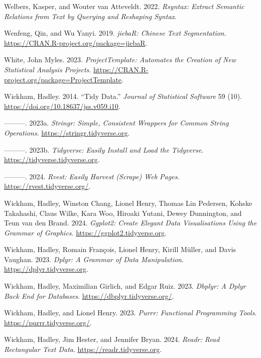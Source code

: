 \documentclass[
  letterpaper,
]{latex/krantz}
\newlength{\cslhangindent}
\newenvironment{CSLReferences}[2] %
 {\begin{list}{}{%
  \setlength{\itemindent}{0pt}
  \setlength{\leftmargin}{0pt}
  \setlength{\parsep}{0pt}
  \ifodd #1
   \setlength{\leftmargin}{\cslhangindent}
   \setlength{\itemindent}{-1\cslhangindent}
  \fi
  \setlength{\itemsep}{#2\baselineskip}}}
 {\end{list}}
\theoremstyle{definition}
\theoremstyle{remark}
\begin{document}
\begin{CSLReferences}{1}{0}
Welbers, Kasper, and Wouter van Atteveldt. 2022. \emph{Rsyntax: Extract
Semantic Relations from Text by Querying and Reshaping Syntax}.

Wenfeng, Qin, and Wu Yanyi. 2019. \emph{jiebaR: Chinese Text
Segmentation}. \url{https://CRAN.R-project.org/package=jiebaR}.

White, John Myles. 2023. \emph{ProjectTemplate: Automates the Creation
of New Statistical Analysis Projects}.
\url{https://CRAN.R-project.org/package=ProjectTemplate}.

Wickham, Hadley. 2014. {``Tidy Data.''} \emph{Journal of Statistical
Software} 59 (10). \url{https://doi.org/10.18637/jss.v059.i10}.

---------. 2023a. \emph{Stringr: Simple, Consistent Wrappers for Common
String Operations}. \url{https://stringr.tidyverse.org}.

---------. 2023b. \emph{Tidyverse: Easily Install and Load the
Tidyverse}. \url{https://tidyverse.tidyverse.org}.

---------. 2024. \emph{Rvest: Easily Harvest (Scrape) Web Pages}.
\url{https://rvest.tidyverse.org/}.

Wickham, Hadley, Winston Chang, Lionel Henry, Thomas Lin Pedersen,
Kohske Takahashi, Claus Wilke, Kara Woo, Hiroaki Yutani, Dewey
Dunnington, and Teun van den Brand. 2024. \emph{Ggplot2: Create Elegant
Data Visualisations Using the Grammar of Graphics}.
\url{https://ggplot2.tidyverse.org}.

Wickham, Hadley, Romain François, Lionel Henry, Kirill Müller, and Davis
Vaughan. 2023. \emph{Dplyr: A Grammar of Data Manipulation}.
\url{https://dplyr.tidyverse.org}.

Wickham, Hadley, Maximilian Girlich, and Edgar Ruiz. 2023. \emph{Dbplyr:
A Dplyr Back End for Databases}. \url{https://dbplyr.tidyverse.org/}.

Wickham, Hadley, and Lionel Henry. 2023. \emph{Purrr: Functional
Programming Tools}. \url{https://purrr.tidyverse.org/}.

Wickham, Hadley, Jim Hester, and Jennifer Bryan. 2024. \emph{Readr: Read
Rectangular Text Data}. \url{https://readr.tidyverse.org}.


\end{CSLReferences}
\end{document}
